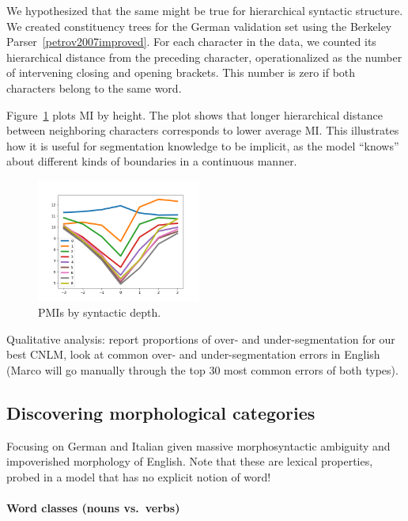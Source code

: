 We hypothesized that the same might be true for hierarchical syntactic structure.
We created constituency trees for the German validation set using the Berkeley Parser~\ref{petrov2007improved}.
For each character in the data, we counted its hierarchical distance from the preceding character, operationalized as the number of intervening closing and opening brackets.
This number is zero if both characters belong to the same word.

Figure~\ref{fig:syntax-depth} plots MI by height.
The plot shows that longer hierarchical distance between neighboring characters corresponds to lower average MI.
This illustrates how it is useful for
segmentation knowledge to be implicit, as the model ``knows'' about
different kinds of boundaries in a continuous manner.



\begin{figure}
\includegraphics[width=0.48\textwidth]{figures/segmentation-profile-pmis-german-all-heights.png}
\caption{PMIs by syntactic depth.}\label{fig:syntax-depth}
\end{figure}




Qualitative analysis: report proportions of over- and
under-segmentation for our best CNLM, look at common over- and
under-segmentation errors in English (Marco will go manually
through the top 30 most common errors of both types).

\subsection{Discovering morphological categories}
\label{sec:categories}

Focusing on German and Italian given massive morphosyntactic ambiguity
and impoverished morphology of English. Note that these are lexical
properties, probed in a model that has no explicit notion of word!

\paragraph{Word classes (nouns vs.~verbs)}



